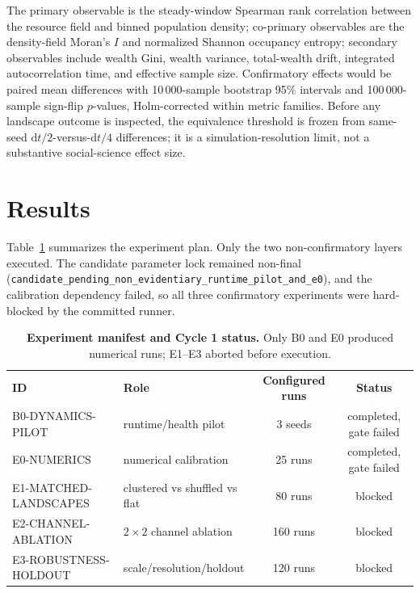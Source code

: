 \documentclass[aps,prl,reprint,superscriptaddress,amsmath,amssymb]{revtex4-2}
\begin{document}
The primary observable is the steady-window Spearman rank correlation between the resource field and binned population density; co-primary observables are the density-field Moran's $I$ and normalized Shannon occupancy entropy; secondary observables include wealth Gini, wealth variance, total-wealth drift, integrated autocorrelation time, and effective sample size. Confirmatory effects would be paired mean differences with 10\,000-sample bootstrap 95\% intervals and 100\,000-sample sign-flip $p$-values, Holm-corrected within metric families. Before any landscape outcome is inspected, the equivalence threshold is frozen from same-seed $\mathrm{d}t/2$-versus-$\mathrm{d}t/4$ differences; it is a simulation-resolution limit, not a substantive social-science effect size.

\section{Results}

Table~\ref{tab:manifest} summarizes the experiment plan. Only the two non-confirmatory layers executed. The candidate parameter lock remained non-final (\texttt{candidate\_pending\_non\_evidentiary\_runtime\_pilot\_and\_e0}), and the calibration dependency failed, so all three confirmatory experiments were hard-blocked by the committed runner.

\begin{table}[htbp]
\caption{\textbf{Experiment manifest and Cycle 1 status.} Only B0 and E0 produced numerical runs; E1--E3 aborted before execution.}
\label{tab:manifest}
\begin{ruledtabular}
\begin{tabular}{llcc}
\textbf{ID} & \textbf{Role} & \textbf{Configured runs} & \textbf{Status}\\
B0-DYNAMICS-PILOT & runtime/health pilot & 3 seeds & completed, gate failed\\
E0-NUMERICS & numerical calibration & 25 runs & completed, gate failed\\
E1-MATCHED-LANDSCAPES & clustered vs shuffled vs flat & 80 runs & blocked\\
E2-CHANNEL-ABLATION & $2\times2$ channel ablation & 160 runs & blocked\\
E3-ROBUSTNESS-HOLDOUT & scale/resolution/holdout & 120 runs & blocked\\
\end{tabular}
\end{ruledtabular}
\end{table}
\end{document}
